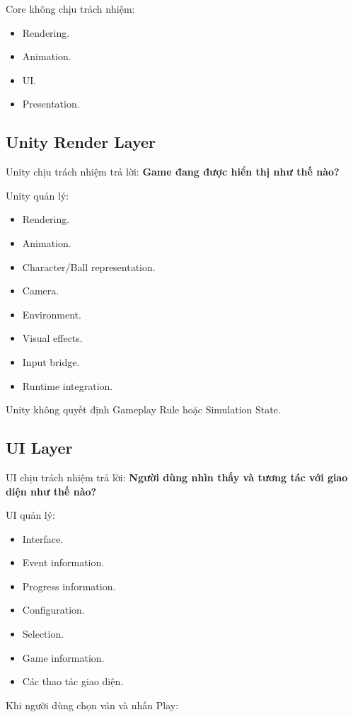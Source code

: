 \documentclass[12pt,a4paper]{article}
\begin{document}
Core không chịu trách nhiệm:
\begin{itemize}[nosep]
  \item Rendering.
  \item Animation.
  \item UI.
  \item Presentation.
\end{itemize}

\subsection*{Unity Render Layer}

Unity chịu trách nhiệm trả lời: \textbf{Game đang được hiển thị như thế nào?}

Unity quản lý:
\begin{itemize}[nosep]
  \item Rendering.
  \item Animation.
  \item Character/Ball representation.
  \item Camera.
  \item Environment.
  \item Visual effects.
  \item Input bridge.
  \item Runtime integration.
\end{itemize}

Unity không quyết định Gameplay Rule hoặc Simulation State.

\subsection*{UI Layer}

UI chịu trách nhiệm trả lời: \textbf{Người dùng nhìn thấy và tương tác với giao diện như thế nào?}

UI quản lý:
\begin{itemize}[nosep]
  \item Interface.
  \item Event information.
  \item Progress information.
  \item Configuration.
  \item Selection.
  \item Game information.
  \item Các thao tác giao diện.
\end{itemize}

Khi người dùng chọn ván và nhấn Play:
\end{document}
